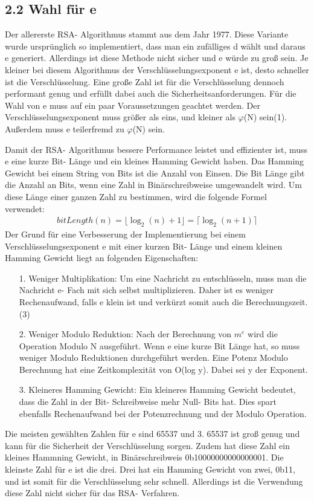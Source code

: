 \documentclass[course=asp]{aspdoc}
\begin{document}
\subsection*{2.2 Wahl für e }
Der allererste RSA- Algorithmus stammt aus dem Jahr 1977. Diese Variante wurde ursprünglich so implementiert, dass man ein zufälliges d wählt und daraus e generiert. Allerdings ist diese Methode nicht sicher und e würde zu groß sein. Je kleiner bei diesem Algorithmus der Verschlüsselungsexponent e ist, desto schneller ist die Verschlüsselung. Eine große Zahl ist für die Verschlüsselung dennoch performant genug und erfüllt dabei auch die Sicherheitsanforderungen. Für die Wahl von e muss auf ein paar Voraussetzungen geachtet werden. Der Verschlüsselungsexponent muss größer als eins, und kleiner als $\varphi $(N) sein(1). Außerdem muss e teilerfremd zu $\varphi $(N) sein.

Damit der RSA- Algorithmus bessere Performance leistet und effizienter ist, muss e eine kurze Bit- Länge und ein kleines Hamming Gewicht haben. Das Hamming Gewicht bei einem String von Bits ist die Anzahl von Einsen. Die Bit Länge gibt die Anzahl an Bits, wenn eine Zahl in Binärschreibweise umgewandelt wird. Um diese Länge einer ganzen Zahl zu bestimmen, wird die folgende Formel verwendet:
\begin{align}
	bitLength(n) = \lfloor \log_{2}(n) + 1 \rfloor = \lceil \log_{2}(n + 1)\rceil
\end{align}
Der Grund für eine Verbesserung der Implementierung bei einem Verschlüsselungsexponent e mit einer kurzen Bit- Länge und einem kleinen Hamming Gewicht liegt an folgenden Eigenschaften:
\begin{itemize}
 \item [1.] Weniger Multiplikation: Um eine Nachricht zu entschlüsseln, muss man die Nachricht e- Fach mit sich selbst multiplizieren. Daher ist es weniger Rechenaufwand, falls e klein ist und verkürzt somit auch die Berechnungszeit.(3)
 \item [2.] Weniger Modulo Reduktion: Nach der Berechnung von $m^{e}$ wird die Operation Modulo N ausgeführt. Wenn e eine kurze Bit Länge hat, so muss weniger Modulo Reduktionen durchgeführt werden. Eine Potenz Modulo Berechnung hat eine Zeitkomplexität von O(log y). Dabei sei y der Exponent.   
 \item [3.] Kleineres Hamming Gewicht: Ein kleineres Hamming Gewicht bedeutet, dass die Zahl in der Bit- Schreibweise mehr Null- Bits hat. Dies spart ebenfalls Rechenaufwand bei der Potenzrechnung und der Modulo Operation.
\end{itemize}
Die meisten gewählten Zahlen für e sind 65537 und 3. 65537 ist groß genug und kann für die Sicherheit der Verschlüsselung sorgen. Zudem hat diese Zahl ein kleines Hammning Gewicht, in Binärschreibweis 0b10000000000000001. Die kleinste Zahl für e ist die drei. Drei hat ein Hamming Gewicht von zwei, 0b11, und ist somit für die Verschlüsselung sehr schnell. Allerdings ist die Verwendung diese Zahl nicht sicher für das RSA- Verfahren. %
\end{document}
